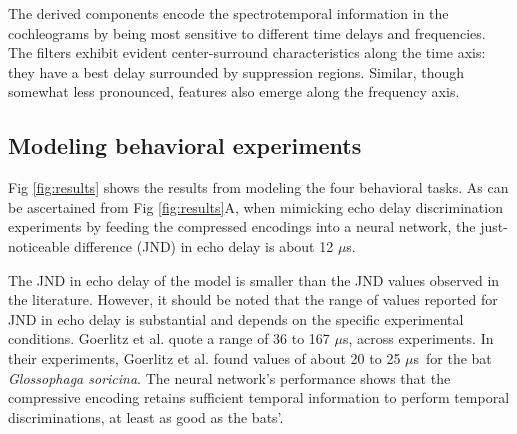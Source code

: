 \documentclass[10pt,letterpaper]{article}
\newcommand{\us}{$\mu$s}
\begin{document}
The derived components encode the spectrotemporal information in the cochleograms by being most sensitive to different time delays and frequencies. The filters exhibit evident center-surround characteristics along the time axis: they have a best delay surrounded by suppression regions. Similar, though somewhat less pronounced, features also emerge along the frequency axis. 

\subsection*{Modeling behavioral experiments}

Fig \ref{fig:results} shows the results from modeling the four behavioral tasks. As can be ascertained from Fig \ref{fig:results}A, when mimicking echo delay discrimination experiments by feeding the compressed encodings into a neural network, the just-noticeable difference (JND) in echo delay is about 12 \us.

The JND in echo delay of the model is smaller than the JND values observed in the literature. However, it should be noted that the range of values reported for JND in echo delay is substantial and depends on the specific experimental conditions. Goerlitz et al. \cite{Goerlitz2010} quote a range of 36 to 167 \us, across experiments. In their experiments, Goerlitz et al. \cite{Goerlitz2010} found values of about 20 to 25 \us\ for the bat \textit{Glossophaga soricina}. The neural network's performance shows that the compressive encoding retains sufficient temporal information to perform temporal discriminations, at least as good as the bats'.
\end{document}
